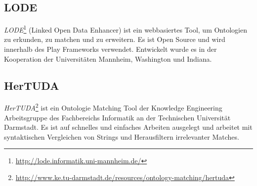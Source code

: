 		\subsection{LODE}
		\textit{LODE}\footnote{\url{http://lode.informatik.uni-mannheim.de/}} (Linked
		Open Data Enhancer) ist ein webbasiertes Tool, um Ontologien zu erkunden, zu matchen und zu erweitern. Es ist Open Source und
		wird innerhalb des Play Frameworks   verwendet. Entwickelt wurde es in der
		Kooperation der Universitäten Mannheim, Washington und Indiana.
		
		\subsection{HerTUDA}
		\textit{HerTUDA}\footnote{\url{http://www.ke.tu-darmstadt.de/resources/ontology-matching/hertuda}}
		ist ein Ontologie Matching Tool der Knowledge Engineering Arbeitsgruppe des Fachbereichs Informatik an der Technischen Universität
		Darmstadt. Es ist auf schnelles und einfaches Arbeiten ausgelegt und arbeitet
		mit syntaktischen Vergleichen von Strings und Herausfiltern irrelevanter
		Matches.
		
		\cleardoublepage
		\pagebreak[4]